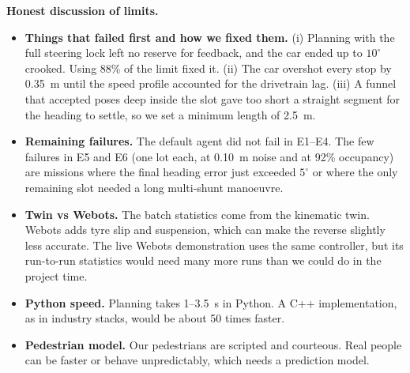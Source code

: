 \documentclass[12pt,a4paper]{article}
\begin{document}
\textbf{Honest discussion of limits.}
\begin{itemize}[itemsep=1pt,topsep=2pt]
\item \textbf{Things that failed first and how we fixed them.} (i) Planning with the full steering lock left no reserve for feedback, and the car ended up to $10^\circ$ crooked. Using 88\% of the limit fixed it. (ii) The car overshot every stop by 0.35~m until the speed profile accounted for the drivetrain lag. (iii) A funnel that accepted poses deep inside the slot gave too short a straight segment for the heading to settle, so we set a minimum length of 2.5~m.
\item \textbf{Remaining failures.} The default agent did not fail in E1--E4. The few failures in E5 and E6 (one lot each, at 0.10~m noise and at 92\% occupancy) are missions where the final heading error just exceeded $5^\circ$ or where the only remaining slot needed a long multi-shunt manoeuvre.
\item \textbf{Twin vs Webots.} The batch statistics come from the kinematic twin. Webots adds tyre slip and suspension, which can make the reverse slightly less accurate. The live Webots demonstration uses the same controller, but its run-to-run statistics would need many more runs than we could do in the project time.
\item \textbf{Python speed.} Planning takes 1--3.5~s in Python. A C++ implementation, as in industry stacks, would be about 50 times faster.
\item \textbf{Pedestrian model.} Our pedestrians are scripted and courteous. Real people can be faster or behave unpredictably, which needs a prediction model.
\end{itemize}

\end{document}
